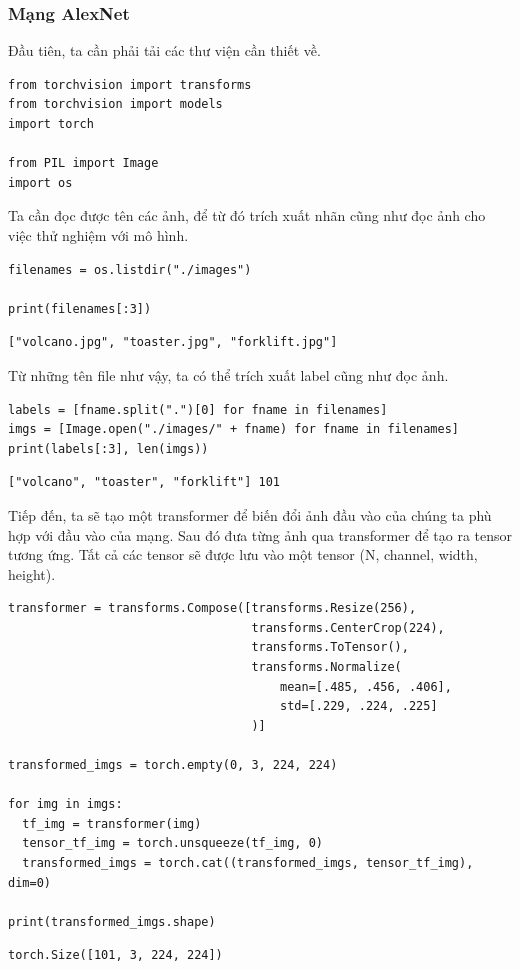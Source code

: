 \documentclass[a4paper]{article}
\begin{document}
\subsubsection{Mạng AlexNet}
Đầu tiên, ta cần phải tải các thư viện cần thiết về.
\begin{lstlisting}
from torchvision import transforms
from torchvision import models
import torch

from PIL import Image
import os
\end{lstlisting}
Ta cần đọc được tên các ảnh, để từ đó trích xuất nhãn cũng như đọc ảnh cho việc thử nghiệm với mô hình.
\begin{lstlisting}
filenames = os.listdir("./images")

print(filenames[:3])
\end{lstlisting}
\begin{verbatim}
["volcano.jpg", "toaster.jpg", "forklift.jpg"]    
\end{verbatim}
Từ những tên file như vậy, ta có thể trích xuất label cũng như đọc ảnh.
\begin{lstlisting}
labels = [fname.split(".")[0] for fname in filenames]
imgs = [Image.open("./images/" + fname) for fname in filenames]
print(labels[:3], len(imgs))
\end{lstlisting}
\begin{verbatim}
["volcano", "toaster", "forklift"] 101
\end{verbatim}
Tiếp đến, ta sẽ tạo một transformer để biến đổi ảnh đầu vào của chúng ta phù hợp với đầu vào của mạng. Sau đó đưa từng ảnh qua transformer để tạo ra tensor tương ứng. Tất cả các tensor sẽ được lưu vào một tensor (N, channel, width, height).
\begin{lstlisting}
transformer = transforms.Compose([transforms.Resize(256),
                                  transforms.CenterCrop(224),
                                  transforms.ToTensor(),
                                  transforms.Normalize(
                                      mean=[.485, .456, .406],
                                      std=[.229, .224, .225]
                                  )]

transformed_imgs = torch.empty(0, 3, 224, 224)

for img in imgs:
  tf_img = transformer(img)
  tensor_tf_img = torch.unsqueeze(tf_img, 0)
  transformed_imgs = torch.cat((transformed_imgs, tensor_tf_img), dim=0)

print(transformed_imgs.shape)
\end{lstlisting}
\begin{verbatim}
torch.Size([101, 3, 224, 224])
\end{verbatim}
\end{document}
